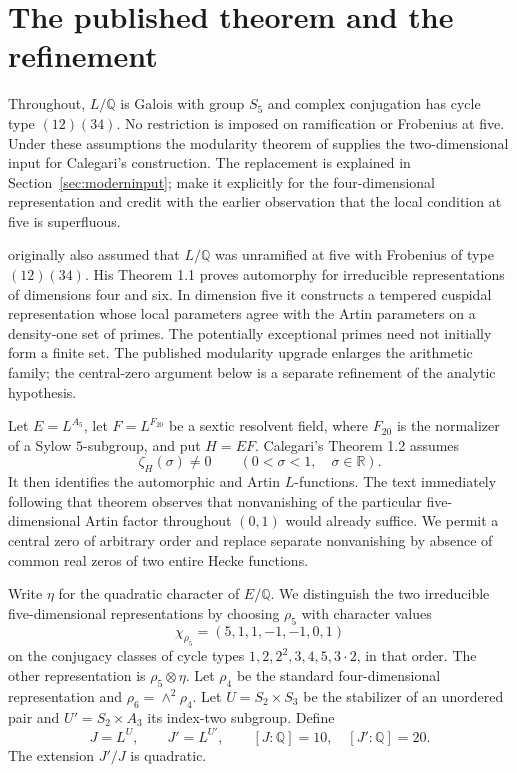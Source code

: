 \documentclass[11pt]{article}
\theoremstyle{definition}
\theoremstyle{remark}
\newcommand{\Q}{\mathbb Q}
\newcommand{\R}{\mathbb R}
\newcommand{\rh}{\rho_5}
\numberwithin{equation}{section}
\begin{document}
\section{The published theorem and the refinement}

Throughout, $L/\Q$ is Galois with group $S_5$ and complex conjugation has cycle type $(12)(34)$. No restriction is imposed on ramification or Frobenius at five. Under these assumptions the modularity theorem of \citet[Th\'eor\`eme 0.3]{pillonistroh} supplies the two-dimensional input for Calegari's construction. The replacement is explained in Section~\ref{sec:moderninput}; \citet[Theorem 1.2 and Section 4.2]{kharelarosawiese} make it explicitly for the four-dimensional representation and credit \citet{dwyer2014} with the earlier observation that the local condition at five is superfluous.

\citet[Theorems 1.1--1.2]{calegari} originally also assumed that $L/\Q$ was unramified at five with Frobenius of type $(12)(34)$. His Theorem 1.1 proves automorphy for irreducible representations of dimensions four and six. In dimension five it constructs a tempered cuspidal representation whose local parameters agree with the Artin parameters on a density-one set of primes. The potentially exceptional primes need not initially form a finite set. The published modularity upgrade enlarges the arithmetic family; the central-zero argument below is a separate refinement of the analytic hypothesis.

Let $E=L^{A_5}$, let $F=L^{F_{20}}$ be a sextic resolvent field, where $F_{20}$ is the normalizer of a Sylow $5$-subgroup, and put $H=EF$. Calegari's Theorem 1.2 assumes
\begin{equation}\label{eq:original}
\zeta_H(\sigma)\ne0\qquad(0<\sigma<1,\quad \sigma\in\R).
\end{equation}
It then identifies the automorphic and Artin $L$-functions. The text immediately following that theorem observes that nonvanishing of the particular five-dimensional Artin factor throughout $(0,1)$ would already suffice. We permit a central zero of arbitrary order and replace separate nonvanishing by absence of common real zeros of two entire Hecke functions.

Write $\eta$ for the quadratic character of $E/\Q$. We distinguish the two irreducible five-dimensional representations by choosing $\rh$ with character values
\begin{equation}\label{eq:rhochar}
\chi_{\rh}=(5,1,1,-1,-1,0,1)
\end{equation}
on the conjugacy classes of cycle types
$1,2,2^2,3,4,5,3\cdot2$, in that order. The other representation is $\rh\otimes\eta$. Let $\rho_4$ be the standard four-dimensional representation and $\rho_6=\wedge^2\rho_4$. Let $U=S_2\times S_3$ be the stabilizer of an unordered pair and $U'=S_2\times A_3$ its index-two subgroup. Define
\[
J=L^U,\qquad J'=L^{U'},\qquad [J:\Q]=10,\quad[J':\Q]=20.
\]
The extension $J'/J$ is quadratic.
\end{document}
